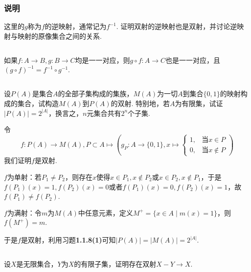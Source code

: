 \subsubsection{说明}
这里的$g$称为$f$的{\heiti 逆映射}，通常记为$f^{-1}$. 证明双射的逆映射也是双射，并讨论逆映射与映射的原像集合之间的关系.

\Proofbyintimidation

\subsection{}
如果$f:A\rightarrow B, g:B\rightarrow C$均是一一对应，则$g\circ f:A\rightarrow C$也是一一对应，且$(g\circ f)^{-1}=f^{-1}\circ g^{-1}$.


\subsection{}
设$P(A)$是集合$A$的全部子集构成的集族，$M(A)$为一切$A$到集合$\{0,1\}$的映射构成的集合，试构造$M(A)$到$P(A)$的双射. 特别地，若$A$为有限集，试证$|P(A)|=2^{|A|}$，换言之，$n$元集合共有$2^n$个子集.

\jie 令
$$f:P(A)\rightarrow M(A), P\subset A\mapsto \left(
g_P: A\rightarrow \{0,1\},
x\mapsto
\left\{
\begin{matrix}
1, & \text{当}x\in P\\
0, & \text{当}x\notin P
\end{matrix}
\right.
\right)$$
我们证明$f$是双射.

$f$为单射：若$P_1\neq P_2$，则存在$x$使得$x\in P_1, x\notin P_2$或$x\in P_2, x\notin P_1$，于是$f(P_1)(x)=1,f(P_2)(x)=0$或者$f(P_1)(x)=0,f(P_2)(x)=1$，故$f(P_1)\neq f(P_2)$.

$f$为满射：令$m$为$M(A)$中任意元素，定义$M^+=\{x\in A\mid m(x)=1\}$，则$f(M^+)=m$.

于是$f$是双射，利用{\heiti 习题}\textbf{1.1.8(1)}可知$|P(A)|=|M(A)|=2^{|A|}$.

\subsection{}
设$X$是无限集合，$Y$为$X$的有限子集，证明存在双射$X-Y\rightarrow X$.

